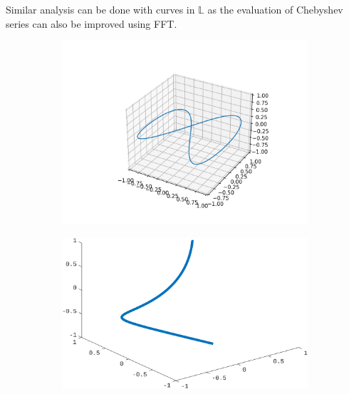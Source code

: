 \documentclass[../dissertation.tex]{subfiles}
\begin{document}
Similar analysis can be done with curves in $\mathbb{L}$ as the evaluation of Chebyshev series can also be improved using FFT\cite{Trefethen_2020}.


\begin{figure}[tbp]
    \centering
    \begin{subfigure}[b]{0.5\textwidth}
        \centering
        \includegraphics[width=\textwidth]{sections/FourierSeriesImgs/Fourier0}
    \end{subfigure}
    \begin{subfigure}[b]{0.45\textwidth}
        \centering
        \includegraphics[width=\textwidth]{sections/FourierSeriesImgs/Chebyshev0}
    \end{subfigure}
    \begin{subfigure}[b]{0.5\textwidth}
        \centering

\end{subfigure}
\end{figure}
\end{document}
